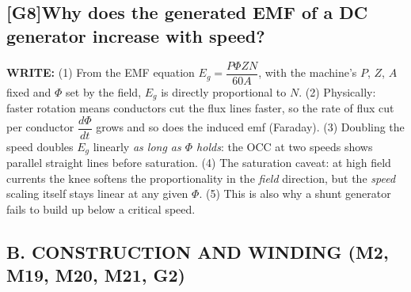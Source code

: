 \documentclass[11pt]{article}
\newcommand{\q}[2]{\subsection*{\color{copper}#1\quad\color{iron}#2}}
\newcommand{\w}[1]{\textbf{\color{copper}WRITE:} #1}
\begin{document}
\q{[G8]}{Why does the generated EMF of a DC generator increase with speed?}
\w{(1) From the EMF equation $E_g = \dfrac{P \Phi Z N}{60 A}$, with the machine's $P$, $Z$, $A$ fixed and $\Phi$ set by the field, $E_g$ is directly proportional to $N$. (2) Physically: faster rotation means conductors cut the flux lines faster, so the rate of flux cut per conductor $\dfrac{d\Phi}{dt}$ grows and so does the induced emf (Faraday). (3) Doubling the speed doubles $E_g$ linearly \emph{as long as $\Phi$ holds}: the OCC at two speeds shows parallel straight lines before saturation. (4) The saturation caveat: at high field currents the knee softens the proportionality in the \emph{field} direction, but the \emph{speed} scaling itself stays linear at any given $\Phi$. (5) This is also why a shunt generator fails to build up below a critical speed.}

\hrulefill
\subsection*{\color{copper}B. CONSTRUCTION AND WINDING (M2, M19, M20, M21, G2)}
\end{document}
